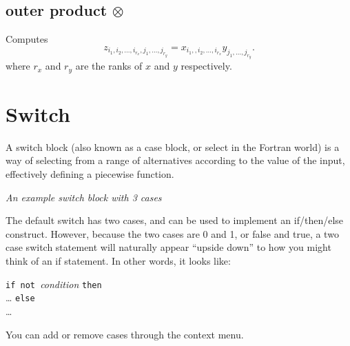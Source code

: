 \subsection{outer product $\otimes$}\label{Operation:outerProduct}
Computes 
\begin{displaymath}
z_{i_1,i_2,\ldots,i_{r_x},j_1,\ldots,j_{r_y}} =
x_{i_1,,i_2,\ldots,i_{r_x}}y_{j_1,\ldots,j_{r_y}}.
\end{displaymath}
where $r_x$ and $r_y$ are the ranks of $x$ and $y$ respectively.

\section{Switch}\label{SwitchIcon}

A switch block (also known as a case block, or select in the Fortran
world) is a way of selecting from a range of alternatives according
to the value of the input, effectively defining a piecewise function.

\begin{center}
{\em An example switch block with 3 cases}
\end{center}

The default switch has two cases, and can be used to implement an
if/then/else construct. However, because the two cases are 0 and 1,
or false and true, a two case switch statement will naturally appear
``upside down'' to how you might think of an if statement. In other
words, it looks like:

\parbox{\textwidth}{
{\tt if not }{\em condition} {\tt then}\\
 \ldots
{\tt else}\\
\ldots
}

You can add or remove cases through the context menu. 


